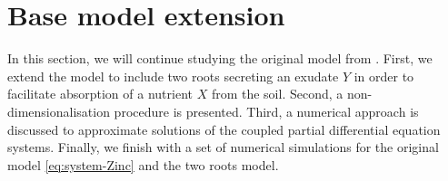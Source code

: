 \documentclass[11pt]{article}
\numberwithin{equation}{section}
\begin{document}
\newpage

\section{Base model extension}
\label{sec:Base}


In this section, we will continue studying the original model from \cite{Ptashnyk-2011}. First, we extend the model to include two roots secreting an exudate $Y$ in order to facilitate absorption of a nutrient $X$ from the soil. Second, a non-dimensionalisation procedure is presented. Third, a numerical approach is discussed to approximate solutions of the coupled partial differential equation systems. Finally, we finish with a set of numerical simulations for the original model \eqref{eq:system-Zinc} and the two roots model.

\end{document}
